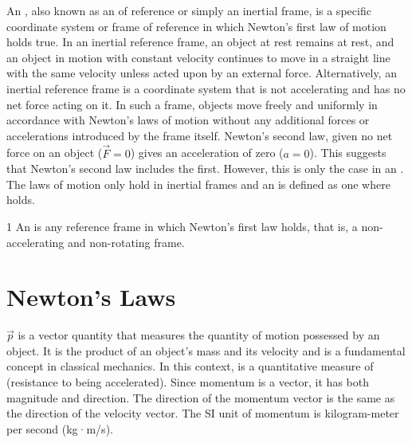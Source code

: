 An , also known as an  of reference or simply an inertial frame, is a specific coordinate system or frame of reference in which Newton's first law of motion holds true. In an inertial reference frame, an object at rest remains at rest, and an object in motion with constant velocity continues to move in a straight line with the same velocity unless acted upon by an external force. Alternatively, an inertial reference frame is a coordinate system that is not accelerating and has no net force acting on it. In such a frame, objects move freely and uniformly in accordance with Newton's laws of motion without any additional forces or accelerations introduced by the frame itself. Newton's second law, given no net force on an object ($\vec{F}=0$) gives an acceleration of zero ($a=0$). This suggests that Newton's second law includes the first. However, this is only the case in an . The laws of motion only hold in inertial frames and an  is defined as one where  holds.

\begin{defn}{1}
An  is any reference frame in which Newton's first law holds, that is, a non-accelerating and non-rotating frame.
\end{defn}





















\section{Newton's Laws}

 $\vec{p}$ is a vector quantity that measures the quantity of motion possessed by an object. It is the product of an object's mass and its velocity and is a fundamental concept in classical mechanics. In this context,  is a quantitative measure of  (resistance to being accelerated). Since momentum is a vector, it has both magnitude and direction. The direction of the momentum vector is the same as the direction of the velocity vector. The SI unit of momentum is kilogram-meter per second (kg·m/s).

